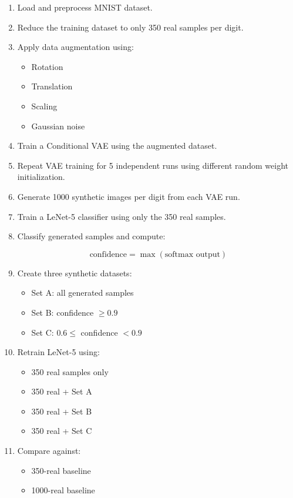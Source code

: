 \begin{enumerate}
    \item Load and preprocess MNIST dataset.
    
    \item Reduce the training dataset to only 350 real samples per digit.
    
    \item Apply data augmentation using:
    \begin{itemize}
        \item Rotation
        \item Translation
        \item Scaling
        \item Gaussian noise
    \end{itemize}
    
    \item Train a Conditional VAE using the augmented dataset.
    
    \item Repeat VAE training for 5 independent runs using different random weight initialization.
    
    \item Generate 1000 synthetic images per digit from each VAE run.
    
    \item Train a LeNet-5 classifier using only the 350 real samples.
    
    \item Classify generated samples and compute:
    
    \[
    \text{confidence} = \max(\text{softmax output})
    \]
    
    \item Create three synthetic datasets:
    
    \begin{itemize}
        \item Set A: all generated samples
        \item Set B: confidence $\geq 0.9$
        \item Set C: $0.6 \leq$ confidence $< 0.9$
    \end{itemize}
    
    \item Retrain LeNet-5 using:
    \begin{itemize}
        \item 350 real samples only
        \item 350 real + Set A
        \item 350 real + Set B
        \item 350 real + Set C
    \end{itemize}
    
    \item Compare against:
    \begin{itemize}
        \item 350-real baseline
        \item 1000-real baseline
    \end{itemize}
    
\end{enumerate}

